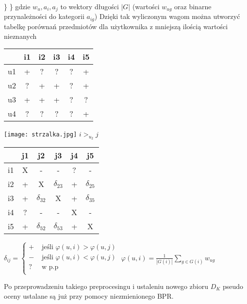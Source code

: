 \documentclass{pracamgr}
\begin{document}
     \hspace*{16pt}	\}\newline
     \hspace*{0pt}\}\newline
     {\scriptsize
      gdzie $w_u,a_i,a_j$ to wektory długości $|G|$ (wartości $w_{ug}$ oraz binarne przynależności do kategorii $a_{ig}$)
     }\newline
     Dzięki tak wyliczonym wagom można utworzyć tabelkę porównań przedmiotów dla użytkownika z mniejszą ilością wartości nieznanych\newline
     \begin{multicols}{3}
      \begin{tabular}{c|c|c|c|c|c|}
        & i1 & i2 & i3 & i4 & i5 \\
       \hline
       u1 & + & ? & ? & ? & + \\
       \hline
       u2 & ? & + & + & ? & + \\    
       \hline
       u3 & + & + & + & ? & ? \\
       \hline
       u4 & ? & ? & ? & ? & + \\    
      \end{tabular}
      \begin{center}
       \texttt{[image: strzalka.jpg]}\newline
       $i>_{u_2}j$
      \end{center}
      \begin{tabular}{c|c|c|c|c|c|}
          & j1 & j2 & 		j3 & 		j4 & j5 \\
       \hline
       i1 & X &	- &	 	 - &		 ? & - \\
       \hline
       i2 & + &	X &	 	 $\delta_{23}$ & + & $\delta_{25}$ \\    
       \hline
       i3 & + &	$\delta_{32}$ & X &		 + & $\delta_{35}$ \\    
       \hline
       i4 & ? &	- &	 	 - &		 X & - \\
       \hline
       i5 & + &	$\delta_{52}$ & $\delta_{53}$ & + & X \\ 
      \end{tabular}
     \end{multicols}
     \begin{center}
      $\delta_{ij}=\left\{\begin{array}{cc}
       + &\text{ jeśli } \varphi(u,i)>\varphi(u,j)\\
       - &\text{ jeśli } \varphi(u,i)<\varphi(u,j)\\
       ? &\text{ w p.p }\\
      \end{array}\right.$\quad\quad\quad\quad\quad\quad\quad
      $\varphi(u,i)=\frac{1}{|G(i)|}\sum_{g\in G(i)}w_{ug}$
     \end{center}
     Po przeprowadzeniu takiego preprocesingu i ustaleniu nowego zbioru $D_K$ pseudo oceny ustalane są już przy pomocy niezmienionego BPR.
\end{document}
